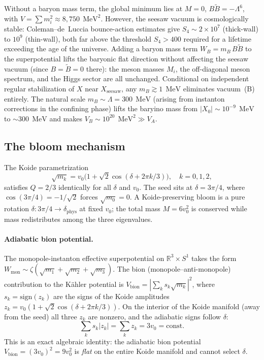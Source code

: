 \documentclass[12pt,a4paper]{article}
\newcommand{\MeV}{\,\text{MeV}}
\begin{document}
Without a baryon mass term, the global minimum lies at
$M = 0$, $B\tilde B = -\Lambda^6$, with
$V = \sum m_i^2 \approx 8{,}750\;\MeV^2$.
However, the seesaw vacuum is cosmologically stable:
Coleman--de~Luccia bounce-action estimates give
$S_4 \sim 2 \times 10^7$ (thick-wall) to $10^9$ (thin-wall),
both far above the threshold $S_4 > 400$ required for a lifetime
exceeding the age of the universe.
Adding a baryon mass term
$W_B = m_B\,B\tilde B$ to the superpotential lifts the baryonic
flat direction without affecting the seesaw vacuum
(since $B = \tilde B = 0$ there): the meson masses $M_i$, the off-diagonal meson spectrum,
and the Higgs sector are all unchanged.
Conditional on independent regular stabilization of $X$ near $X_{\text{seesaw}}$,
any $m_B \gtrsim 1\;\MeV$ eliminates vacuum~(B) entirely.
The natural scale $m_B \sim \Lambda = 300\;\MeV$
(arising from instanton corrections in the confining phase) lifts
the baryino mass from $|X_0| \sim 10^{-9}\;\MeV$ to $\sim 300\;\MeV$
and makes $V_B \sim 10^{20}\;\MeV^2 \gg V_A$.

\subsection{The bloom mechanism}

The Koide parametrization
\begin{equation*}
  \sqrt{m_k} = v_0\bigl(1 + \sqrt{2}\cos(\delta + 2\pi k/3)\bigr),
  \quad k = 0,1,2,
\end{equation*}
satisfies $Q = 2/3$ identically for all $\delta$ and $v_0$.
The seed sits at $\delta = 3\pi/4$, where
$\cos(3\pi/4) = -1/\sqrt{2}$ forces $\sqrt{m_0} = 0$.
A Koide-preserving bloom is a pure rotation
$\delta \colon 3\pi/4 \to \delta_{\mathrm{phys}}$ at fixed $v_0$;
the total mass $M = 6v_0^2$ is conserved while mass redistributes
among the three eigenvalues.

\paragraph{Adiabatic bion potential.}
The monopole-instanton effective superpotential on $\mathbb{R}^3\times S^1$
takes the form $W_{\mathrm{mon}} \sim \zeta(\sqrt{m_1}+\sqrt{m_2}+\sqrt{m_3})$.
The bion (monopole--anti-monopole) contribution to the
K\"{a}hler potential is $V_{\mathrm{bion}} = |\!\sum_k s_k\sqrt{m_k}|^2$,
where $s_k = \mathrm{sign}(z_k)$ are the signs of the
Koide amplitudes $z_k = v_0(1+\sqrt{2}\cos(\delta+2\pi k/3))$.
On the interior of the Koide manifold (away from the seed) all
three $z_k$ are nonzero, and the adiabatic signs follow $\delta$:
\begin{equation*}
  \sum_k s_k |z_k| = \sum_k z_k = 3v_0 = \mathrm{const}.
\end{equation*}
This is an exact algebraic identity: the adiabatic bion potential
$V_{\mathrm{bion}} = (3v_0)^2 = 9v_0^2$ is \emph{flat} on the entire Koide
manifold and cannot select $\delta$.
\end{document}
